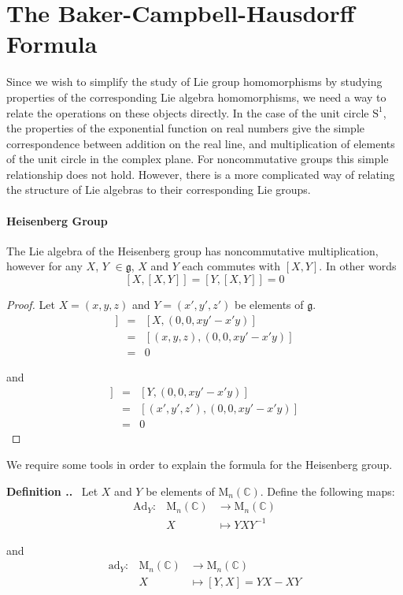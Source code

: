 \documentclass[honours]{UNSWthesis}
\newcommand{\C}{\mathbb{C}}
\newcommand{\g}{\mathfrak{g}}
\newcommand{\1}{\mathbf{e}_{1}}
\newcommand{\2}{\mathbf{e}_{3}}
\newcommand{\3}{\mathbf{e}_{3}}
\newcounter{Item}[section]
\newenvironment{Definition}{\medskip
                            \refstepcounter{Item}
                            \noindent
                           {\bf Definition \thesection.\theItem.}\ }
                           {\medskip}
\begin{document}
\section{The Baker-Campbell-Hausdorff Formula}

Since we wish to simplify the study of Lie group homomorphisms by studying properties of the corresponding Lie algebra homomorphisms, we need a way to relate the operations on these objects directly. In the case of the unit circle $\mathrm{S}^{1}$, the properties of the exponential function on real numbers give the simple correspondence between addition on the real line, and multiplication of elements of the unit circle in the complex plane. For noncommutative groups this simple relationship does not hold. However, there is a more complicated way of relating the structure of Lie algebras to their corresponding Lie groups. 

\paragraph{Heisenberg Group}
The Lie algebra of the Heisenberg group has noncommutative multiplication, however for any $X$, $Y$ $\in \g$, $X$ and $Y$ each commutes with $[X,Y]$. In other words
\[
[X,[X,Y]]=[Y,[X,Y]]=0
\]
\begin{proof}
Let $X=(x,y,z)$ and $Y=(x',y',z')$ be elements of $\g$. 
\begin{eqnarray*}
[X,[X,Y]] &=& [X, (0,0,xy'-x'y)] \\
&=&[(x,y,z),(0,0,xy'-x'y)] \\
&=& 0
\end{eqnarray*}

and
\begin{eqnarray*}
[Y,[X,Y]] &=& [Y, (0,0,xy'-x'y)] \\
&=&[(x',y',z'),(0,0,xy'-x'y)] \\
&=& 0
\end{eqnarray*}
\end{proof}

We require some tools in order to explain the formula for the Heisenberg group. 

\begin{Definition}\label{Two Adjoint Mappings}
Let $X$ and $Y$ be elements of $\mathrm{M}_{n}(\C)$. Define the following maps: 
\begin{eqnarray*}
\mathrm{Ad}_{Y}:& \mathrm{M}_{n}(\C) & \longrightarrow \mathrm{M}_{n}(\C) \\
&X& \longmapsto YXY^{-1}
\end{eqnarray*}

and
\begin{eqnarray*}
\mathrm{ad}_{Y}:& \mathrm{M}_{n}(\C) & \longrightarrow \mathrm{M}_{n}(\C) \\
&X& \longmapsto [Y,X]=YX - XY
\end{eqnarray*}

\end{Definition}
\end{document}
